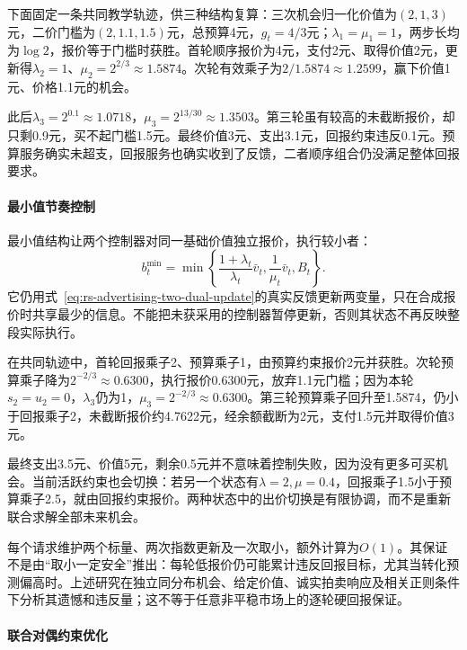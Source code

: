 下面固定一条共同教学轨迹，供三种结构复算：三次机会归一化价值为$(2,1,3)$元，二价门槛为$(2,1.1,1.5)$元，总预算4元，$g_t=4/3$元；$\lambda_1=\mu_1=1$，两步长均为$\log2$，报价等于门槛时获胜。首轮顺序报价为4元，支付2元、取得价值2元，更新得$\lambda_2=1$、$\mu_2=2^{2/3}\approx1.5874$。次轮有效乘子为$2/1.5874\approx1.2599$，赢下价值1元、价格1.1元的机会。

此后$\lambda_3=2^{0.1}\approx1.0718$，$\mu_3=2^{13/30}\approx1.3503$。第三轮虽有较高的未截断报价，却只剩0.9元，买不起门槛1.5元。最终价值3元、支出3.1元，回报约束违反0.1元。预算服务确实未超支，回报服务也确实收到了反馈，二者顺序组合仍没满足整体回报要求。

\paragraph{最小值节奏控制}
\label{sec:rs-advertising-min-pacing}

最小值结构让两个控制器对同一基础价值独立报价，执行较小者：
\begin{equation}
  b_t^{\mathrm{min}}
   =\min\!\left\{
       \frac{1+\lambda_t}{\lambda_t}\bar v_t,
       \frac{1}{\mu_t}\bar v_t,
       B_t\right\}.
  \label{eq:rs-advertising-min-pacing}
\end{equation}
它仍用式~\eqref{eq:rs-advertising-two-dual-update}的真实反馈更新两变量，只在合成报价时共享最少的信息。不能把未获采用的控制器暂停更新，否则其状态不再反映整段实际执行。

在共同轨迹中，首轮回报乘子2、预算乘子1，由预算约束报价2元并获胜。次轮预算乘子降为$2^{-2/3}\approx0.6300$，执行报价0.6300元，放弃1.1元门槛；因为本轮$s_2=u_2=0$，$\lambda_3$仍为1，$\mu_3=2^{-2/3}\approx0.6300$。第三轮预算乘子回升至1.5874，仍小于回报乘子2，未截断报价约4.7622元，经余额截断为2元，支付1.5元并取得价值3元。

最终支出3.5元、价值5元，剩余0.5元并不意味着控制失败，因为没有更多可买机会。当前活跃约束也会切换：若另一个状态有$\lambda=2,\mu=0.4$，回报乘子1.5小于预算乘子2.5，就由回报约束报价。两种状态中的出价切换是有限协调，而不是重新联合求解全部未来机会。

每个请求维护两个标量、两次指数更新及一次取小，额外计算为$O(1)$。其保证不是由“取小一定安全”推出：每轮低报价仍可能累计违反回报目标，尤其当转化预测偏高时。上述研究在独立同分布机会、给定价值、诚实拍卖响应及相关正则条件下分析其遗憾和违反量；这不等于任意非平稳市场上的逐轮硬回报保证。

\paragraph{联合对偶约束优化}
\label{sec:rs-advertising-joint-pacing}

